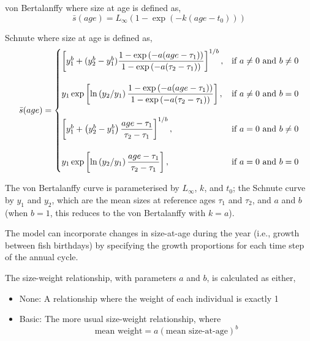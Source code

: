 \begin{description}
\item{von Bertalanffy} where size at age is defined as,
\begin{equation} 
\bar{s}(age)= L_\infty \left( 1 - \exp \left( -k \left(age-t_0 \right) \right) \right)
\end{equation}

\item{Schnute} where size at age is defined as,
\begin{equation}
\bar{s}(age)=\displaystyle\begin{cases}
  \left[ y_1^b + (y_2^b - y_1^b) \dfrac{1-\exp \left(-a(age - \tau_1) \right)}{1-\exp \left(-a(\tau_2 - \tau_1) \right)} \right]^{1/b}, & \text{if $a\ne0$ and $b\ne0$} \\
  \AddVspace
  y_1 \exp \left[ \ln \left( y_2 / y_1 \right) \dfrac{1-\exp \left(-a(age - \tau_1) \right)}{1-\exp \left(-a(\tau_2 - \tau_1) \right)} \right], & \text{if $a\ne0$ and $b=0$} \\
  \AddVspace
  \left[ y_1^b + \left( y_2^b - y_1^b \right) \dfrac{age-\tau_1}{\tau_2 - \tau_1} \right]^{1/b}, & \text{if $a=0$ and $b\ne0$} \\
  \AddVspace
  y_1 \exp \left[ \ln \left( y_2/y_1 \right) \dfrac{age-\tau_1}{\tau_2 - \tau_1} \right] , & \text{if $a=0$ and $b=0$} \\
  \end{cases}
\end{equation}
\end{description}

The von Bertalanffy curve is parameterised by $L_\infty$, $k$, and $t_0$; the Schnute curve \citep{836} by $y_1$ and $y_2$, which are the mean sizes at reference ages $\tau_1$ and $\tau_2$, and $a$ and $b$ (when $b=1$, this reduces to the von Bertalanffy with $k=a$). 

The model can incorporate changes in size-at-age during the year (i.e., growth between fish birthdays) by specifying the growth proportions for each time step of the annual cycle.


The size-weight relationship, with parameters $a$ and $b$, is calculated as either,

\begin{itemize}
  \item{None:} A relationship where the weight of each individual is exactly 1 
  \item{Basic:} The more usual size-weight relationship, where 
  \begin{equation}
    \text{mean weight}=a(\text{mean size-at-age})^b
  \end{equation}
\end{itemize}
  
